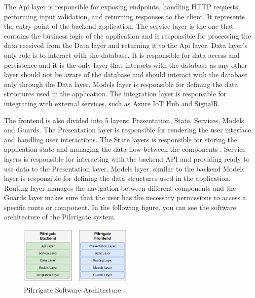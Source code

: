 The Api layer is responsible for exposing endpoints, handling HTTP requests, performing input validation, and 
returning responses to the client. It represents the entry point of the backend application\cite{layerArchitecture}.
The service layer is the one that contains the business logic of the application and 
is responsible for processing the data received from the Data layer and returning it to the Api layer.
Data layer's only role is to interact with the database. It is responsible for data access and persistence and it 
is the only layer that interacts with the database as any other layer should not be aware of the database
and should interact with the database only through the Data layer. Models layer
is responsible for defining the data structures used in the application.
The integration layer is responsible for integrating with external services, such as Azure IoT Hub and SignalR.

The frontend is also divided into 5 layers: Presentation, State, Services, Models and Guards. The Presentation layer 
is responsible for rendering the user interface and handling user interactions. The State layers is responsible for
storing the application state and managing the data flow between the components \cite{ngrxStoreGuide}. 
Service layers is responsible for interacting with the backend API and providing ready to use data to the Presentation layer.
Models layer, similar to the backend Models layer is responsible for defining the data structures used in the application\cite{typescriptInterfaces}.
Routing layer manages the navigation between different components\cite{angularServices} and the Guards layer makes sure that the user
has the necessary permissions to access a specific route or component\cite{angularGuards}. 
In the following figure, you can see the software architecture of the PiIrrigate system.
\begin{figure}[H]
    \centering
    \includegraphics[width=0.5\textwidth]{images/sw-architecture.png}
    \caption{PiIrrigate Software Architecture}
    \label{fig:software-architecture}
\end{figure}

